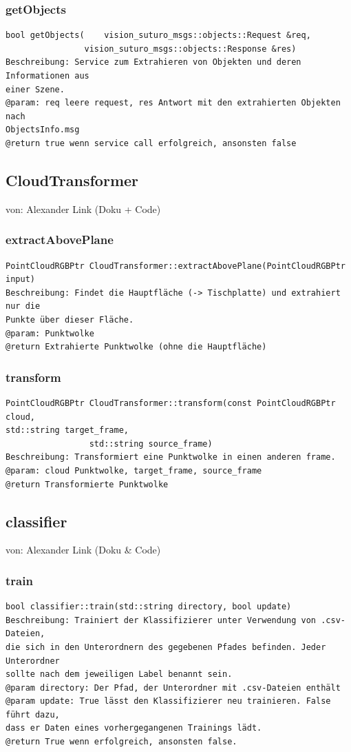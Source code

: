 \documentclass{suturo}
\makeatletter
\newcommand{\chapterauthor}[1]{%
  {\parindent0pt\vspace*{-27pt}%
  \linespread{0}\small\begin{flushright}von: #1\end{flushright}%
  \par\nobreak\vspace*{0pt}}
  \@afterheading%
}
\makeatother
\begin{document}
\subsubsection{getObjects}
\begin{verbatim}
bool getObjects(	vision_suturo_msgs::objects::Request &req, 
			    vision_suturo_msgs::objects::Response &res)
Beschreibung: Service zum Extrahieren von Objekten und deren Informationen aus
einer Szene.
@param: req leere request, res Antwort mit den extrahierten Objekten nach
ObjectsInfo.msg
@return true wenn service call erfolgreich, ansonsten false
\end{verbatim}\label{func:getobjects}


\subsection*{CloudTransformer}
\chapterauthor{Alexander Link (Doku + Code)}

\subsubsection{extractAbovePlane}
\begin{verbatim}
PointCloudRGBPtr CloudTransformer::extractAbovePlane(PointCloudRGBPtr input)
Beschreibung: Findet die Hauptfläche (-> Tischplatte) und extrahiert nur die
Punkte über dieser Fläche.
@param: Punktwolke
@return Extrahierte Punktwolke (ohne die Hauptfläche)
\end{verbatim}\label{func:extractaboveplane}
\subsubsection{transform}
\begin{verbatim}
PointCloudRGBPtr CloudTransformer::transform(const PointCloudRGBPtr cloud,
std::string target_frame,
                 std::string source_frame)
Beschreibung: Transformiert eine Punktwolke in einen anderen frame.
@param: cloud Punktwolke, target_frame, source_frame
@return Transformierte Punktwolke
\end{verbatim}\label{func:transform}

\subsection*{classifier}
\chapterauthor {Alexander Link (Doku \& Code)}

\subsubsection{train}
\begin{verbatim}
bool classifier::train(std::string directory, bool update)
Beschreibung: Trainiert der Klassifizierer unter Verwendung von .csv-Dateien,
die sich in den Unterordnern des gegebenen Pfades befinden. Jeder Unterordner
sollte nach dem jeweiligen Label benannt sein.
@param directory: Der Pfad, der Unterordner mit .csv-Dateien enthält
@param update: True lässt den Klassifizierer neu trainieren. False führt dazu,
dass er Daten eines vorhergegangenen Trainings lädt.
@return True wenn erfolgreich, ansonsten false.
\end{verbatim}\label{func:train}
\end{document}

